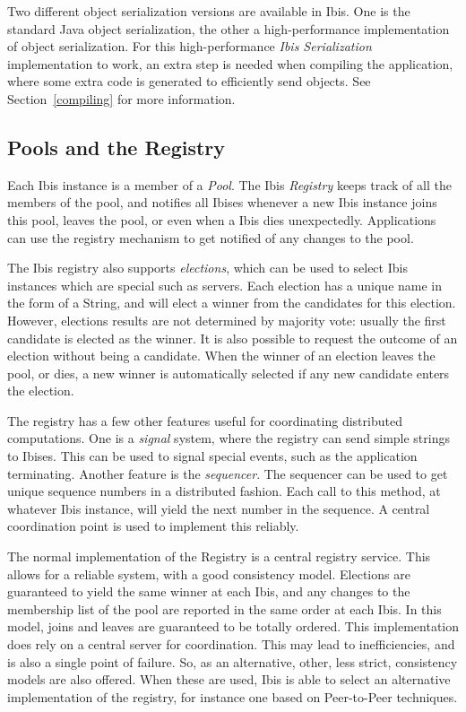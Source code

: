 \documentclass[10pt]{article}
\begin{document}
Two different object serialization versions are available in Ibis. One is
the standard Java object serialization, the other a high-performance
implementation of object serialization. For this high-performance
\emph{Ibis Serialization} implementation to work, an extra step is needed
when compiling the application, where some extra code is generated to
efficiently send objects. See Section~\ref{compiling} for
more information.

\subsection{Pools and the Registry}


Each Ibis instance is a member of a \emph{Pool}. The Ibis
\emph{Registry} keeps track of all the members of the pool, and notifies
all Ibises whenever a new Ibis instance joins this pool, leaves the
pool, or even when a Ibis dies unexpectedly. Applications can use the
registry mechanism to get notified of any changes to the pool.

The Ibis registry also supports \emph{elections}, which can be used to
select Ibis instances which are special such as servers.  Each election
has a unique name in the form of a String, and will elect a winner from
the candidates for this election. However, elections results are not determined 
by majority vote:
usually the first candidate is elected as the winner. It is also
possible to request the outcome of an election without being a
candidate. When the winner of an election leaves the pool, or dies, a
new winner is automatically selected if any new candidate enters the
election.

The registry has a few other features useful for coordinating
distributed computations. One is a \emph{signal} system, where the
registry can send simple strings to Ibises. This can be used to signal
special events, such as the application terminating. Another feature is
the \emph{sequencer}. The sequencer can be used to get unique sequence
numbers in a distributed fashion. Each call to this method, at
whatever Ibis instance, will yield the next number in the sequence. A
central coordination point is used to implement this reliably.

The normal implementation of the Registry is a central registry service.
This allows for a reliable system, with a good consistency model.
Elections are guaranteed to yield the same winner at each Ibis, and any
changes to the membership list of the pool are reported in the same
order at each Ibis. In this model, joins and leaves are guaranteed to be
totally ordered. This implementation does rely on a central server
for coordination. This may lead to inefficiencies, and is also a single
point of failure. So, as an alternative, other, less strict, consistency
models are also offered. When these are used, Ibis is able to select an
alternative implementation of the registry, for instance one based on
Peer-to-Peer techniques.
\end{document}
